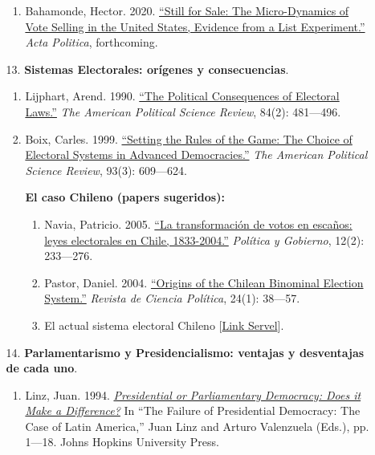 \documentclass[letterpaper]{article}
\begin{document}
\begin{enumerate}
\begin{enumerate}
\begin{enumerate}
						\item Bahamonde, Hector. 2020. \href{https://github.com/hbahamonde/Ciencia_Politica_I/raw/master/Readings/Bahamonde.pdf}{``Still for Sale: The Micro-Dynamics of Vote Selling in the United States, Evidence from a List Experiment.''} \emph{Acta Politica}, forthcoming.
					\end{enumerate}
				
				\item[13.] {\bf Sistemas Electorales: or\'igenes y consecuencias}.
					\begin{enumerate}
						\item Lijphart, Arend. 1990. \href{https://github.com/hbahamonde/Ciencia_Politica_I/raw/master/Readings/Lijphart_1990.pdf}{``The Political Consequences of Electoral Laws.''} \emph{The American Political Science Review}, 84(2): 481---496.

						\item Boix, Carles. 1999. \href{https://github.com/hbahamonde/Ciencia_Politica_I/raw/master/Readings/Boix.pdf}{``Setting the Rules of the Game: The Choice of Electoral Systems in Advanced Democracies.''} \emph{The American Political Science Review}, 93(3): 609---624. 
									
						\item[{\Pointinghand}] {\bf El caso Chileno (papers sugeridos):}
									\begin{enumerate}
										\item Navia, Patricio. 2005. \href{https://github.com/hbahamonde/Ciencia_Politica_I/raw/master/Readings/Navia_2005.pdf}{``La transformaci\'on de votos en esca\~nos: leyes electorales en Chile, 1833-2004.''} \emph{Pol\'itica y Gobierno}, 12(2): 233---276.
										\item Pastor, Daniel. 2004. \href{https://github.com/hbahamonde/Ciencia_Politica_I/raw/master/Readings/Pastor_2004.pdf}{``Origins of the Chilean Binominal Election System.''} \emph{Revista de Ciencia Pol\'itica}, 24(1): 38---57.
										\item El actual sistema electoral Chileno [\href{https://www.servel.cl/nuevo-sistema-electoral-chileno-metodo-dhont-2/}{Link Servel}].
									\end{enumerate}
					\end{enumerate}

				
				\item[14.] {\bf Parlamentarismo y Presidencialismo: ventajas y desventajas de cada uno}.
					\begin{enumerate}
						\item Linz, Juan. 1994. \href{https://github.com/hbahamonde/Ciencia_Politica_I/raw/master/Readings/Linz.pdf}{\emph{Presidential or Parliamentary Democracy: Does it Make a Difference?}} In ``The Failure of Presidential Democracy: The Case of Latin America,'' Juan Linz and Arturo Valenzuela (Eds.), pp. 1---18. Johns Hopkins University Press.%
						

\end{enumerate}
\end{enumerate}
\end{enumerate}
\end{document}
